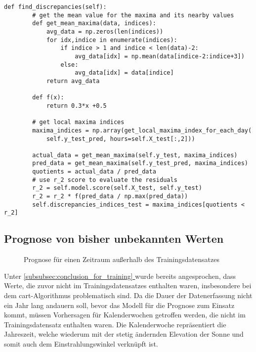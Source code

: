 \documentclass[12pt, a4paper]{article}
\newcommand*{\fullref}[1]{\hyperref[{#1}]{\autoref*{#1} \textit{\nameref*{#1}}}}
\begin{document}
\begin{lstlisting}[basicstyle=\small,label={lst:discrepancies_detection}, caption={Funktion zur Erkennung von Ausreißern}]
def find_discrepancies(self):
        # get the mean value for the maxima and its nearby values
        def get_mean_maxima(data, indices):
            avg_data = np.zeros(len(indices))
            for idx,indice in enumerate(indices):
                if indice > 1 and indice < len(data)-2:
                    avg_data[idx] = np.mean(data[indice-2:indice+3])
                else:
                    avg_data[idx] = data[indice]
            return avg_data
        
        def f(x):
            return 0.3*x +0.5
        
        # get local maxima indices
        maxima_indices = np.array(get_local_maxima_index_for_each_day(
            self.y_test_pred, hours=self.X_test[:,2]))
        
        actual_data = get_mean_maxima(self.y_test, maxima_indices)
        pred_data = get_mean_maxima(self.y_test_pred, maxima_indices)
        quotients = actual_data / pred_data
        # use r_2 score to evaluate the residuals
        r_2 = self.model.score(self.X_test, self.y_test)
        r_2 = r_2 * f(pred_data / np.max(pred_data))
        self.discrepancies_indices_test = maxima_indices[quotients < r_2]        
\end{lstlisting}

\subsection{Prognose von bisher unbekannten Werten}


\begin{figure}[h]
\centering
\def\svgwidth{400pt}

\caption{Prognose für einen Zeitraum außerhalb des Trainingsdatensatzes}
\label{fig:predictions_forecast_1220}
\end{figure}

Unter \fullref{subsubsec:conclusion_for_training} wurde bereits angesprochen, dass Werte, die zuvor nicht im Trainingsdatensatzes enthalten waren, insbesondere bei dem \ac{cart}-Algorithmus problematisch sind. Da die Dauer der Datenerfassung nicht ein Jahr lang andauern soll, bevor das Modell für die Prognose zum Einsatz kommt, müssen Vorhersagen für Kalenderwochen getroffen werden, die nicht im Trainingsdatensatz enthalten waren. Die Kalenderwoche repräsentiert die Jahreszeit, welche wiederum mit der stetig ändernden Elevation der Sonne und somit auch dem Einstrahlungswinkel verknüpft ist.
\end{document}
